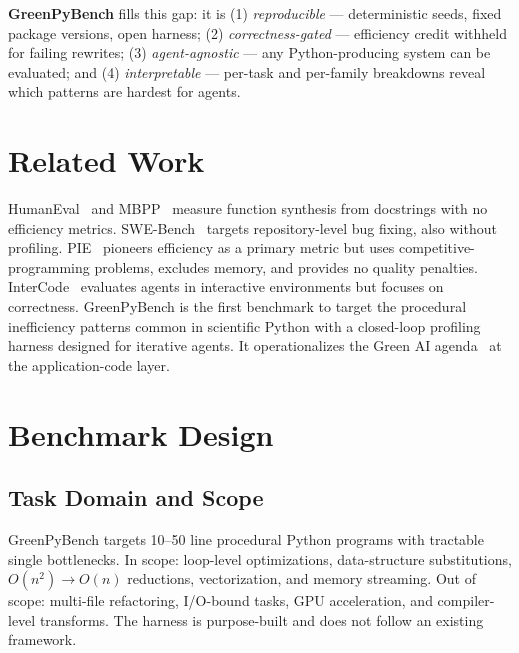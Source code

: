 \documentclass{article}
\begin{document}
\textbf{GreenPyBench} fills this gap: it is (1) \emph{reproducible} --- deterministic seeds, fixed package versions, open harness; (2) \emph{correctness-gated} --- efficiency credit withheld for failing rewrites; (3) \emph{agent-agnostic} --- any Python-producing system can be evaluated; and (4) \emph{interpretable} --- per-task and per-family breakdowns reveal which patterns are hardest for agents.

\section{Related Work}

HumanEval~\cite{chen2021evaluating} and MBPP~\cite{austin2021program} measure function synthesis from docstrings with no efficiency metrics. SWE-Bench~\cite{jimenez2024swebench} targets repository-level bug fixing, also without profiling. PIE~\cite{shypula2023pie} pioneers efficiency as a primary metric but uses competitive-programming problems, excludes memory, and provides no quality penalties. InterCode~\cite{yang2023intercode} evaluates agents in interactive environments but focuses on correctness. GreenPyBench is the first benchmark to target the procedural inefficiency patterns common in scientific Python with a closed-loop profiling harness designed for iterative agents. It operationalizes the Green AI agenda~\cite{schwartz2020green,strubell2019energy} at the application-code layer.

\section{Benchmark Design}

\subsection{Task Domain and Scope}
GreenPyBench targets 10--50 line procedural Python programs with tractable single bottlenecks. In scope: loop-level optimizations, data-structure substitutions, $O(n^2)\!\to\!O(n)$ reductions, vectorization, and memory streaming. Out of scope: multi-file refactoring, I/O-bound tasks, GPU acceleration, and compiler-level transforms. The harness is purpose-built and does not follow an existing framework.
\end{document}
